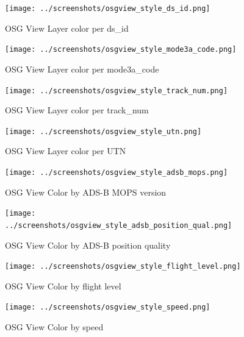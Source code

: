 \begin{figure}[H]
    \hspace*{-2.5cm}
    \texttt{[image: ../screenshots/osgview\_style\_ds\_id.png]}
  \caption{OSG View Layer color per ds\_id}
\end{figure}

\begin{figure}[H]
    \hspace*{-2.5cm}
    \texttt{[image: ../screenshots/osgview\_style\_mode3a\_code.png]}
  \caption{OSG View Layer color per mode3a\_code}
\end{figure}

\begin{figure}[H]
    \hspace*{-2.5cm}
    \texttt{[image: ../screenshots/osgview\_style\_track\_num.png]}
  \caption{OSG View Layer color per track\_num}
\end{figure}

\begin{figure}[H]
    \hspace*{-2.5cm}
    \texttt{[image: ../screenshots/osgview\_style\_utn.png]}
  \caption{OSG View Layer color per UTN}
\end{figure}

\begin{figure}[H]
    \hspace*{-2.5cm}
    \texttt{[image: ../screenshots/osgview\_style\_adsb\_mops.png]}
  \caption{OSG View Color by ADS-B MOPS version}
\end{figure}

\begin{figure}[H]
    \hspace*{-2.5cm}
    \texttt{[image: ../screenshots/osgview\_style\_adsb\_position\_qual.png]}
  \caption{OSG View Color by ADS-B position quality}
\end{figure}

\begin{figure}[H]
    \hspace*{-2.5cm}
    \texttt{[image: ../screenshots/osgview\_style\_flight\_level.png]}
  \caption{OSG View Color by flight level}
\end{figure}

\begin{figure}[H]
    \hspace*{-2.5cm}
    \texttt{[image: ../screenshots/osgview\_style\_speed.png]}
  \caption{OSG View Color by speed}
\end{figure}

